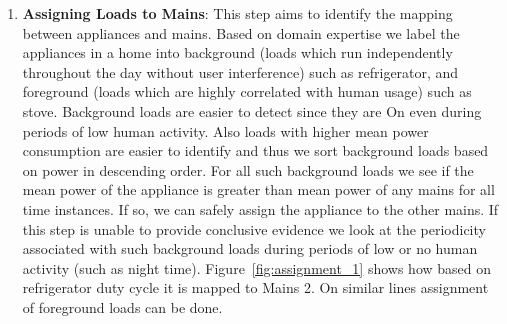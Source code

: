 \documentclass[conference]{IEEEtran}
\newcommand{\figref}[1]{Figure~\ref{#1}}
\begin{document}
\begin{enumerate}
\item \textbf{Assigning Loads to Mains}:
This step aims to identify the mapping between appliances and mains. Based on domain expertise we label the appliances in a home into background (loads which run independently throughout the day without user interference) such as refrigerator, and foreground (loads which are highly correlated with human usage) such as stove. Background loads are easier to detect since they are On even during periods of low human activity. Also loads with higher mean power consumption are easier to identify and thus we sort background loads based on power in descending order. For all such background loads we see if the mean power of the appliance is greater than mean power of any mains for all time instances. If so, we can safely assign the appliance to the other mains. If this step is unable to provide conclusive evidence we look at the periodicity associated with such background loads during periods of low or no human activity (such as night time). \figref{fig:assignment_1} shows how based on refrigerator duty cycle it is mapped to Mains 2. On similar lines assignment of foreground loads can be done.
\begin{figure} 
	

\end{figure}
\end{enumerate}
\end{document}
